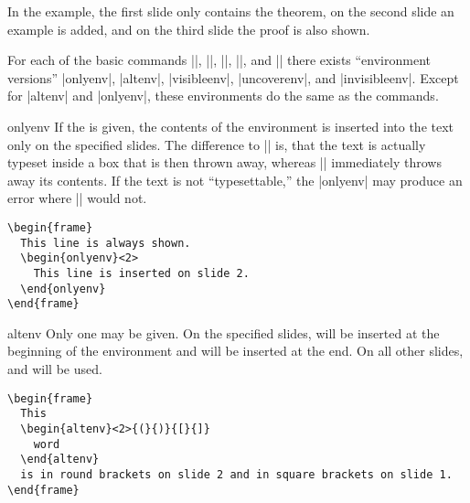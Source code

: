 In the example, the first slide only contains the theorem, on the second slide an example is added, and on the third slide the proof is also shown.

For each of the basic commands |\only|, |\alt|, |\visible|, |\uncover|, and |\invisible| there exists ``environment versions'' |onlyenv|, |altenv|, |visibleenv|, |uncoverenv|, and |invisibleenv|. Except for |altenv| and |onlyenv|, these environments do the same as the commands.

\begin{environment}{{onlyenv}}
  If the  is given, the contents of the environment is inserted into the text only on the specified slides. The difference to |\only| is, that the text is actually typeset inside a box that is then thrown away, whereas |\only| immediately throws away its contents. If the text is not ``typesettable,'' the |onlyenv| may produce an error where |\only| would not.

  \example
\begin{verbatim}
\begin{frame}
  This line is always shown.
  \begin{onlyenv}<2>
    This line is inserted on slide 2.
  \end{onlyenv}
\end{frame}
\end{verbatim}
\end{environment}

\begin{environment}{{altenv}}
  Only one  may be given. On the specified slides,  will be inserted at the beginning of the environment and  will be inserted at the end. On all other slides,  and  will be used.

  \example
\begin{verbatim}
\begin{frame}
  This
  \begin{altenv}<2>{(}{)}{[}{]}
    word
  \end{altenv}
  is in round brackets on slide 2 and in square brackets on slide 1.
\end{frame}
\end{verbatim}
\end{environment}


